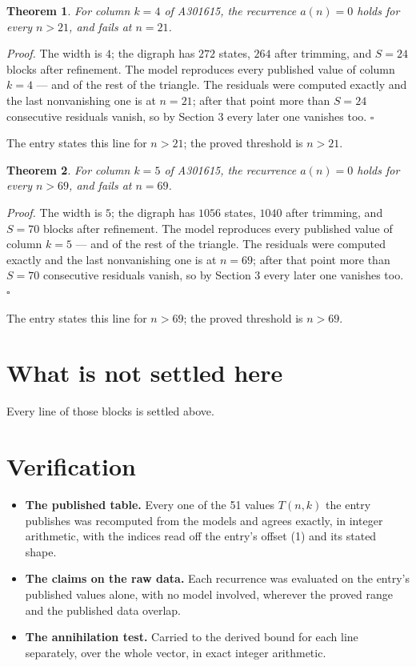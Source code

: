 \documentclass[11pt]{article}
\newtheorem{theorem}{Theorem}
\theoremstyle{definition}
\begin{document}
\begin{theorem} For column $k = 4$ of A301615, the recurrence $a(n) = 0$ holds for every $n > 21$, and fails at $n = 21$.\end{theorem}

{\itshape Proof.} The width is $4$; the digraph has $272$ states, $264$ after trimming, and $S = 24$ blocks after refinement. The model reproduces every published value of column $k = 4$ --- and of the rest of the triangle. The residuals were computed exactly and the last nonvanishing one is at $n = 21$; after that point more than $S = 24$ consecutive residuals vanish, so by Section 3 every later one vanishes too. $\square$

The entry states this line for $n > 21$; the proved threshold is $n > 21$.

\begin{theorem} For column $k = 5$ of A301615, the recurrence $a(n) = 0$ holds for every $n > 69$, and fails at $n = 69$.\end{theorem}

{\itshape Proof.} The width is $5$; the digraph has $1056$ states, $1040$ after trimming, and $S = 70$ blocks after refinement. The model reproduces every published value of column $k = 5$ --- and of the rest of the triangle. The residuals were computed exactly and the last nonvanishing one is at $n = 69$; after that point more than $S = 70$ consecutive residuals vanish, so by Section 3 every later one vanishes too. $\square$

The entry states this line for $n > 69$; the proved threshold is $n > 69$.

\section{What is not settled here}

Every line of those blocks is settled above.

\section{Verification}

\begin{itemize}

\item {\bfseries The published table.} Every one of the 51 values $T(n,k)$ the entry publishes was recomputed from the models and agrees exactly, in integer arithmetic, with the indices read off the entry's offset (1) and its stated shape.

\item {\bfseries The claims on the raw data.} Each recurrence was evaluated on the entry's published values alone, with no model involved, wherever the proved range and the published data overlap.

\item {\bfseries The annihilation test.} Carried to the derived bound for each line separately, over the whole vector, in exact integer arithmetic.

\end{itemize}
\end{document}
